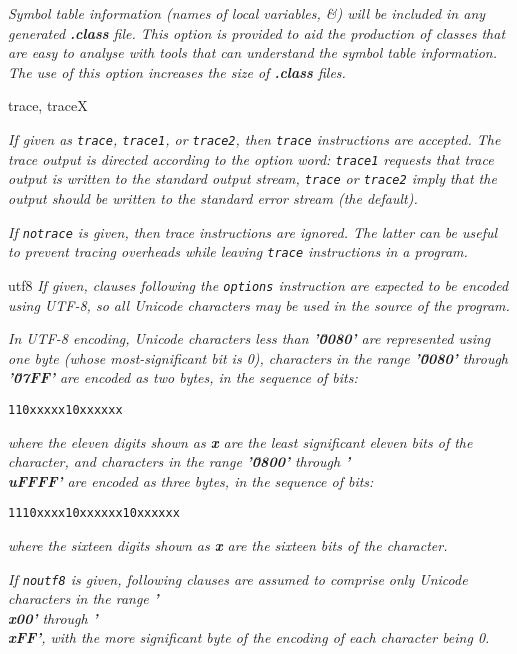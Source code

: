 \begin{description}
\emph{Symbol table information (names of local variables, \&)
will be included in any generated \textbf{.class} file.
This option is provided to aid the production of classes that are easy
to analyse with tools that can understand the symbol table information.
The use of this option increases the size of \textbf{.class}
files.}
\item{trace, traceX}

\emph{If given as \texttt{trace}, \texttt{trace1}, or \texttt{trace2},
then \texttt{trace} instructions are accepted.  The trace output is
directed according to the option word: \texttt{trace1} requests
that trace output is written to the standard output stream,
\texttt{trace} or \texttt{trace2} imply that the output should be
written to the standard error stream (the default).}
 
\emph{If \texttt{notrace} is given, then trace instructions are ignored.
The latter can be useful to prevent tracing overheads while leaving
\texttt{trace} instructions in a program.}
\item{utf8}
\emph{If given, clauses following the \texttt{options} instruction are
expected to be encoded using UTF-8, so all Unicode characters may be
used in the source of the program.}
 
\emph{In UTF-8 encoding, Unicode characters less than \textbf{'\u0080'} are
represented using one byte (whose most-significant bit is 0), characters
in the range \textbf{'\u0080'} through \textbf{'\u07FF'} are encoded
as two bytes, in the sequence of bits:}
\begin{alltt}
110xxxxx 10xxxxxx
\end{alltt}
\emph{where the eleven digits shown as \textbf{x} are the least
significant eleven bits of the character, and characters in the
range \textbf{'\u0800'} through \textbf{'\\uFFFF'} are encoded as
three bytes, in the sequence of bits:}
\begin{alltt}
1110xxxx 10xxxxxx 10xxxxxx
\end{alltt}
\emph{where the sixteen digits shown as \textbf{x} are the
sixteen bits of the character.}
 
\emph{If \texttt{noutf8} is given, following clauses are assumed to comprise
only Unicode characters in the range \textbf{'\\x00'}
through \textbf{'\\xFF'}, with the more significant byte of the
encoding of each character being 0.}
 

\end{description}
